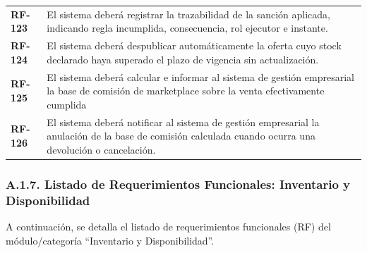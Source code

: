 \documentclass[11pt]{article}
\begin{document}
\begin{longtable}[]{@{}
  >{\raggedright\arraybackslash}p{}
  >{\raggedright\arraybackslash}p{}@{}}
\addlinespace[2pt]
\textbf{RF-123} & El sistema deberá registrar la trazabilidad de la sanción aplicada, indicando regla incumplida, consecuencia, rol ejecutor e instante. \\
\addlinespace[2pt]
\textbf{RF-124} & El sistema deberá despublicar automáticamente la oferta cuyo stock declarado haya superado el plazo de vigencia sin actualización. \\
\addlinespace[2pt]
\textbf{RF-125} & El sistema deberá calcular e informar al sistema de gestión empresarial la base de comisión de marketplace sobre la venta efectivamente cumplida \\
\addlinespace[2pt]
\textbf{RF-126} & El sistema deberá notificar al sistema de gestión empresarial la anulación de la base de comisión calculada cuando ocurra una devolución o cancelación. \\
\end{longtable}

\subsubsection{A.1.7. Listado de Requerimientos Funcionales: Inventario y Disponibilidad}\label{a-1-7-listado-de-requerimientos-funcionales-inventario-y-disponibilidad}

A continuación, se detalla el listado de requerimientos funcionales (RF) del módulo/categoría ``Inventario y Disponibilidad''.
\end{document}
